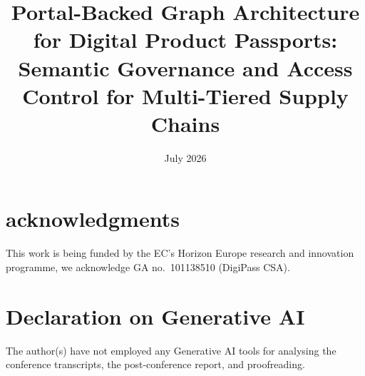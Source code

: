 \documentclass[preprint,12pt]{elsarticle}
\begin{document}
\title{Portal-Backed Graph Architecture for Digital Product Passports: \\
       Semantic Governance and Access Control for Multi-Tiered Supply Chains}
\date{July 2026}

\newcommand{\runninghead}{DPP — The Graph of Passports Model}


\begin{frontmatter}








\end{frontmatter}


\clearpage
\tableofcontents
\clearpage

\clearpage
\listoffigures
\clearpage














\section*{acknowledgments}
This work is being funded by the EC's Horizon Europe research and
innovation programme, we acknowledge GA no.~101138510 (DigiPass CSA).


\section*{Declaration on Generative AI}
The author(s) have not employed any Generative AI tools for analysing the
conference transcripts, the post-conference report, and proofreading.

\appendix

\clearpage

\clearpage



\end{document}
